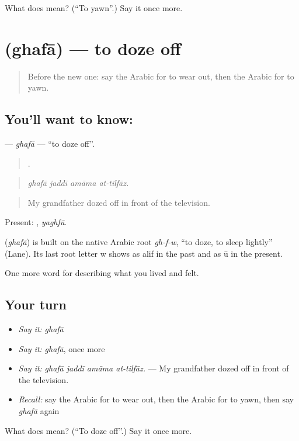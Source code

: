 \begin{tcolorbox}[breakable,colback=teal!4,colframe=teal!35!black,title={Before you move on}]
What does  mean? (\textquotedblleft{}To yawn\textquotedblright{}.) Say it once more.
\end{tcolorbox}
\section[\texorpdfstring{\ar{غفا} (ghafā)}{غفا (ghafā)}]{ (ghafā) — to doze off}

\label{lesson:AR-C514-ghafa}



\begin{quote}
Before the new one: say the Arabic for to wear out, then the Arabic for to yawn.
\end{quote}

\subsection*{You'll want to know: }
\textbf{} — \emph{ghafā} — \textquotedblleft{}to doze off\textquotedblright{}.

\begin{quote}
   .
\end{quote}

\begin{quote}
\emph{ghafā jaddī amāma at-tilfāz.}
\end{quote}

\begin{quote}
My grandfather dozed off in front of the television.
\end{quote}

Present: , \emph{yaghfū}.

\begin{cousinweb}
\textbf{} (\emph{ghafā}) is built on the native Arabic root \emph{gh-f-w}, \textquotedblleft{}to doze, to sleep lightly\textquotedblright{} (Lane). Its last root letter w shows as alif in the past and as ū in the present.
\end{cousinweb}

\begin{grammarlens}[title={What you've built}]
One more word for describing what you lived and felt.
\end{grammarlens}

\subsection*{Your turn}
\begin{itemize}
\raggedright
  \item \emph{Say it:} \emph{ghafā}
  \item \emph{Say it:} \emph{ghafā}, once more
  \item \emph{Say it:} \emph{ghafā jaddī amāma at-tilfāz.} — My grandfather dozed off in front of the television.
  \item \emph{Recall:} say the Arabic for to wear out, then the Arabic for to yawn, then say \emph{ghafā} again
\end{itemize}

\begin{tcolorbox}[breakable,colback=teal!4,colframe=teal!35!black,title={Before you move on}]
What does  mean? (\textquotedblleft{}To doze off\textquotedblright{}.) Say it once more.
\end{tcolorbox}
